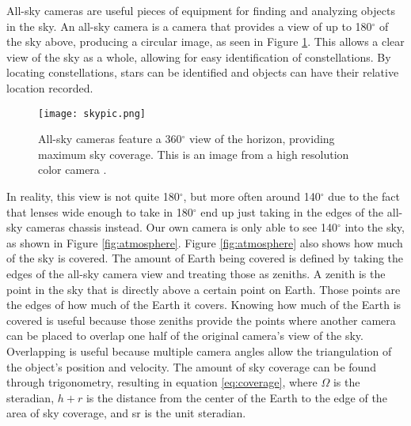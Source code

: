 All-sky cameras are useful pieces of equipment for finding and analyzing objects in the sky. An all-sky camera is a camera that provides a view of up to 180$^{\circ}$ of the sky above, producing a circular image, as seen in Figure \ref{fig:skypic}. This allows a clear view of the sky as a whole, allowing for easy identification of constellations. By locating constellations, stars can be identified and objects can have their relative location recorded. 
\begin{figure}[ht!]
  \centering
  \texttt{[image: skypic.png]}
  \caption{All-sky cameras feature a 360$^{\circ}$ view of the horizon, providing maximum sky coverage. This is an image from a high resolution color camera \protect\cite{Alcor}.}
  \label{fig:skypic}
\end{figure}

In reality, this view is not quite 180$^{\circ}$, but more often around 140$^{\circ}$ due to the fact that lenses wide enough to take in 180$^{\circ}$ end up just taking in the edges of the all-sky cameras chassis instead. Our own camera is only able to see 140$^{\circ}$ into the sky, as shown in Figure \ref{fig:atmosphere}. Figure \ref{fig:atmosphere} also shows how much of the sky is covered. The amount of Earth being covered is defined by taking the edges of the all-sky camera view and treating those as zeniths. A zenith is the point in the sky that is directly above a certain point on Earth. Those points are the edges of how much of the Earth it covers. Knowing how much of the Earth is covered is useful because those zeniths provide the points where another camera can be placed to overlap one half of the original camera's view of the sky. Overlapping is useful because multiple camera angles allow the triangulation of the object's position and velocity. The amount of sky coverage can be found through trigonometry, resulting in equation \ref{eq:coverage}, where $\Omega$ is the steradian, $h+r$ is the distance from the center of the Earth to the edge of the area of sky coverage, and sr is the unit steradian.

